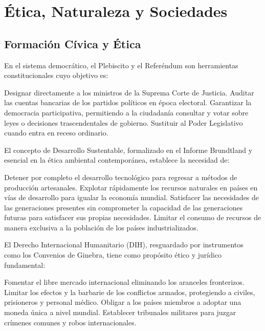 \documentclass[12pt]{evaluasep}
\begin{document}
\begin{questions}
\begin{choices}
    \end{choices}
    
    \newpage

 \section{Ética, Naturaleza y Sociedades}
    \subsection{Formación Cívica y Ética}

    \question En el sistema democrático, el Plebiscito y el Referéndum son herramientas constitucionales cuyo objetivo es:
    \begin{choices}
        \choice Designar directamente a los ministros de la Suprema Corte de Justicia.
        \choice Auditar las cuentas bancarias de los partidos políticos en época electoral.
        \CorrectChoice Garantizar la democracia participativa, permitiendo a la ciudadanía consultar y votar sobre leyes o decisiones trascendentales de gobierno.
        \choice Sustituir al Poder Legislativo cuando entra en receso ordinario.
    \end{choices}

    \question El concepto de Desarrollo Sustentable, formalizado en el Informe Brundtland y esencial en la ética ambiental contemporánea, establece la necesidad de:
    \begin{choices}
        \choice Detener por completo el desarrollo tecnológico para regresar a métodos de producción artesanales.
        \choice Explotar rápidamente los recursos naturales en países en vías de desarrollo para igualar la economía mundial.
        \CorrectChoice Satisfacer las necesidades de las generaciones presentes sin comprometer la capacidad de las generaciones futuras para satisfacer sus propias necesidades.
        \choice Limitar el consumo de recursos de manera exclusiva a la población de los países industrializados.
    \end{choices}

    \question El Derecho Internacional Humanitario (DIH), resguardado por instrumentos como los Convenios de Ginebra, tiene como propósito ético y jurídico fundamental:
    \begin{choices}
        \choice Fomentar el libre mercado internacional eliminando los aranceles fronterizos.
        \CorrectChoice Limitar los efectos y la barbarie de los conflictos armados, protegiendo a civiles, prisioneros y personal médico.
        \choice Obligar a los países miembros a adoptar una moneda única a nivel mundial.
        \choice Establecer tribunales militares para juzgar crímenes comunes y robos internacionales.
    \end{choices}


\end{questions}
\end{document}

